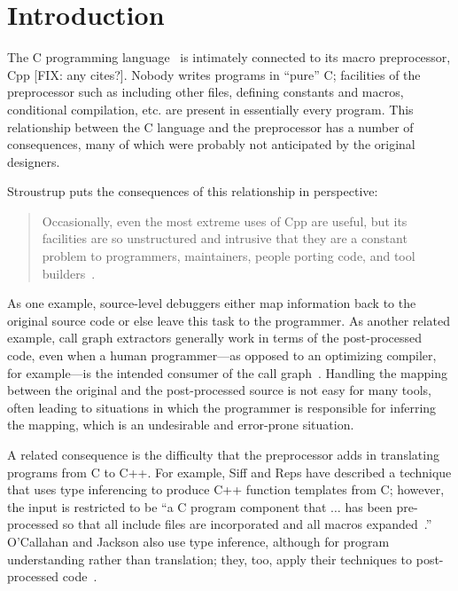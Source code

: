 \bigskip

\section{Introduction}

The C programming language~\cite{kr,ansi} is intimately connected to
its macro preprocessor, Cpp [FIX: any cites?].  Nobody writes
programs in ``pure'' C; facilities of the preprocessor such as
including other files, defining constants and macros, conditional
compilation, etc. are present in essentially every program.  This
relationship between the C language and the preprocessor has a number
of consequences, many of which were probably not anticipated by the
original designers.

Stroustrup puts the consequences of this relationship in perspective:
\begin{quote}
Occasionally, even the most extreme uses of Cpp are useful, but its
facilities are so unstructured and intrusive that they are a constant
problem to programmers, maintainers, people porting code, and tool
builders~\cite[p.~424]{Stroustrup-DesignEvolution}.
\end{quote}

As one example, source-level debuggers either map information back to
the original source code or else leave this task to the programmer.
As another related example, call graph extractors generally work in
terms of the post-processed code, even when a human programmer---as
opposed to an optimizing compiler, for example---is the intended
consumer of the call graph~\cite{Murphy-icse18}.  Handling the mapping
between the original and the post-processed source is not easy for many
tools, often leading to situations in which the programmer is
responsible for inferring the mapping, which is an
undesirable and error-prone situation.

A related consequence is the difficulty that the preprocessor adds in
translating programs from C to C++.  For example, Siff and Reps have
described a technique that uses type inferencing to produce C++
function templates from C; however, the input is restricted to be ``a
C program component that $\ldots$ has been pre-processed so that all
include files are incorporated and all macros
expanded~\cite[p.~145]{Siff-fse96}.''  O'Callahan and Jackson also use
type inference, although for program understanding rather than
translation; they, too, apply their techniques to post-processed
code~\cite{OCallahan-icse97}.  

